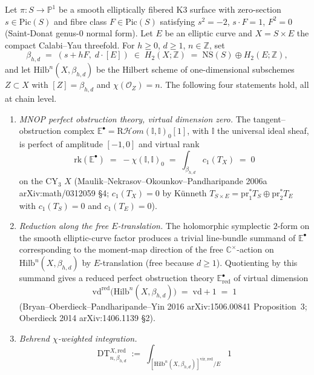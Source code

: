 \begin{proposition}
\label{prop:cy-c-beyond-k3e-reduced-virtual-class-delta5-exponents}
Let $\pi:S\to\mathbb P^1$ be a smooth elliptically fibered K3 surface
with zero-section $s\in\mathrm{Pic}(S)$ and fibre class $F\in\mathrm{Pic}(S)$
satisfying $s^2=-2$, $s\cdot F=1$, $F^2=0$ (Saint-Donat genus-$0$
normal form). Let $E$ be an elliptic curve and $X=S\times E$ the
compact Calabi--Yau threefold. For $h\ge 0$, $d\ge 1$, $n\in\mathbb Z$,
set
\[
 \beta_{h,d}
 \;=\; (s+hF,\; d\cdot[E])
 \;\in\; H_2(X;\mathbb Z) \;=\; \mathrm{NS}(S)\oplus H_2(E;\mathbb Z),
\]
and let $\mathrm{Hilb}^n(X,\beta_{h,d})$ be the Hilbert scheme of
one-dimensional subschemes $Z\subset X$ with $[Z]=\beta_{h,d}$ and
$\chi(\mathcal O_Z)=n$. The following four statements hold, all at
chain level.
\begin{enumerate}
\item \emph{MNOP perfect obstruction theory, virtual dimension zero.}
The tangent--obstruction complex
$\mathbb E^\bullet
= \mathrm{R}\mathcal H\!om(\mathbb I,\mathbb I)_0[1]$,
with $\mathbb I$ the universal ideal sheaf, is perfect of amplitude
$[-1,0]$ and virtual rank
\[
 \mathrm{rk}(\mathbb E^\bullet)
 \;=\; -\chi(\mathbb I,\mathbb I)_0
 \;=\; \int_{\beta_{h,d}} c_1(T_X)
 \;=\; 0
\]
on the CY$_3$ $X$ (Maulik--Nekrasov--Okounkov--Pandharipande 2006a
arXiv:math/0312059 \S 4; $c_1(T_X)=0$ by K\"unneth
$T_{S\times E}=\mathrm{pr}_1^*T_S\oplus\mathrm{pr}_2^*T_E$ with
$c_1(T_S)=0$ and $c_1(T_E)=0$).
\item \emph{Reduction along the free $E$-translation.} The
holomorphic symplectic $2$-form on the smooth elliptic-curve factor
produces a trivial line-bundle summand of $\mathbb E^\bullet$ corresponding
to the moment-map direction of the free $\mathbb C^\times$-action on
$\mathrm{Hilb}^n(X,\beta_{h,d})$ by $E$-translation (free because
$d\ge 1$). Quotienting by this summand gives a reduced perfect
obstruction theory $\mathbb E^\bullet_{\mathrm{red}}$ of virtual dimension
\[
 \mathrm{vd}^{\mathrm{red}}\bigl(\mathrm{Hilb}^n(X,\beta_{h,d})\bigr)
 \;=\; \mathrm{vd}+1 \;=\; 1
\]
(Bryan--Oberdieck--Pandharipande--Yin 2016 arXiv:1506.00841
Proposition~3; Oberdieck 2014 arXiv:1406.1139 \S 2).
\item \emph{Behrend $\chi$-weighted integration.}
\[
 \mathrm{DT}^{X,\mathrm{red}}_{n,\beta_{h,d}}
 \;:=\; \int_{[\mathrm{Hilb}^n(X,\beta_{h,d})]^{\mathrm{vir,red}}/E} 1
\]
\end{enumerate}
\end{proposition}
